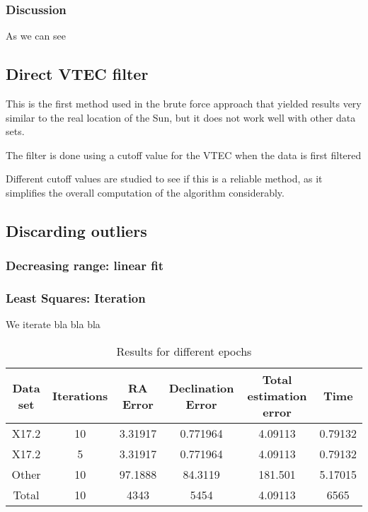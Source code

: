 \subsubsection{Discussion}

As we can see

\subsection{Direct VTEC filter}

This is the first method used in the brute force approach that yielded results very similar to the real location of the Sun, but it does not work well with other data sets.

The filter is done using a cutoff value for the VTEC when the data is first filtered

Different cutoff values are studied to see if this is a reliable method, as it simplifies the overall computation of the algorithm considerably.

\subsection{Discarding outliers}

\subsubsection{Decreasing range: linear fit}

\subsubsection{Least Squares: Iteration}

We iterate bla bla bla

\begin{table}[h!]
	\centering
	\def\arraystretch{1.2}
	\begin{tabular}{|c c c c c c|} 
		\hline
		Data set & Iterations & RA Error & Declination Error & Total estimation error & Time \\ [0.5ex] 
		\hline\hline
		X17.2 & 10 & 3.31917 & 0.771964 & 4.09113 & 0.79132 \\
		\hline
		X17.2 & 5 & 3.31917 & 0.771964 & 4.09113 & 0.79132 \\
		\hline
		Other & 10 & 97.1888 & 84.3119 & 181.501 & 5.17015 \\
		\hline\hline
		Total & 10 & 4343 & 5454 & 4.09113 & 6565 \\
		\hline
	\end{tabular}
	\caption{Results for different epochs}
\end{table}

